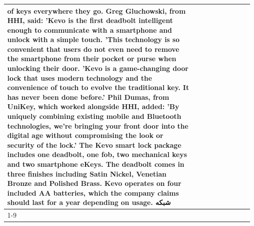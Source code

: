 \begin{table}[H]
\begin{tabular}{lllrlllll}
of keys everywhere they go. Greg Gluchowski, from HHI, said: 'Kevo is the first deadbolt intelligent enough to communicate with a smartphone and unlock with a simple touch. 'This technology is so convenient that users do not even need to remove the smartphone from their pocket or purse when unlocking their door. 'Kevo is a game-changing door lock that uses modern technology and the convenience of touch to evolve the traditional key. It has never been done before.' Phil Dumas, from UniKey, which worked alongside HHI, added: 'By uniquely combining existing mobile and Bluetooth technologies, we’re bringing your front door into the digital age without compromising the look or security of the lock.' The Kevo smart lock package includes one deadbolt, one fob, two mechanical keys and two smartphone eKeys. The deadbolt comes in three finishes including Satin Nickel, Venetian Bronze and Polished Brass. Kevo operates on four included AA batteries, which the company claims should last for a year depending on usage. شبکه \\
\cline{1-9}

\end{tabular}
\end{table}
